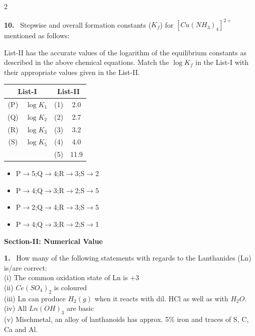 \documentclass[10pt]{extarticle}
\newcommand{\sect}[1]{\par\smallskip\noindent\textbf{#1}\par}
\newcommand{\qn}[1]{\par\smallskip\noindent\textbf{#1.}~}
\newenvironment{qoptions}{\begin{itemize}[leftmargin=1.8em,itemsep=1pt,topsep=2pt,label={}]}{\end{itemize}}
\newcommand{\opt}[2]{\item[(#1)] #2}
\begin{document}
\begin{multicols}{2}
\qn{10} Stepwise and overall formation constants ($K_f$) for $[Cu(NH_3)_4]^{2+}$ mentioned as follows:
\par
{}\par
{}\par
{}\par
{}\par
List-II has the accurate values of the logarithm of the equilibrium constants as described in the above chemical equations. Match the $\log K_f$ in the List-I with their appropriate values given in the List-II.
\begin{center}
\begin{tabular}{|c|c|c|c|}
\hline
\multicolumn{2}{|c|}{List-I} & \multicolumn{2}{c|}{List-II} \\
\hline
(P) & $\log K_1$ & (1) & 2.0 \\
\hline
(Q) & $\log K_2$ & (2) & 2.7 \\
\hline
(R) & $\log K_3$ & (3) & 3.2 \\
\hline
(S) & $\log K_5$ & (4) & 4.0 \\
\hline
 & & (5) & 11.9 \\
\hline
\end{tabular}
\end{center}
\begin{qoptions}
\opt{A}{P$\to$5;Q$\to$4;R$\to$3;S$\to$2}
\opt{B}{P$\to$4;Q$\to$3;R$\to$2;S$\to$5}
\opt{C}{P$\to$2;Q$\to$4;R$\to$3;S$\to$5}
\opt{D}{P$\to$4;Q$\to$3;R$\to$2;S$\to$1}
\end{qoptions}

\sect{Section-II: Numerical Value}

\qn{1} How many of the following statements with regards to the Lanthanides (Ln) is/are correct: \\
(i) The common oxidation state of Ln is +3\\
(ii) $Ce(SO_4)_2$ is coloured\\
(iii) Ln can produce $H_2(g)$ when it reacts with dil. HCl as well as with $H_2O$.\\
(iv) All $Ln(OH)_3$ are basic\\
(v) Mischmetal, an alloy of lanthanoids has approx. 5\% iron and traces of S, C, Ca and Al.


\end{multicols}
\end{document}
